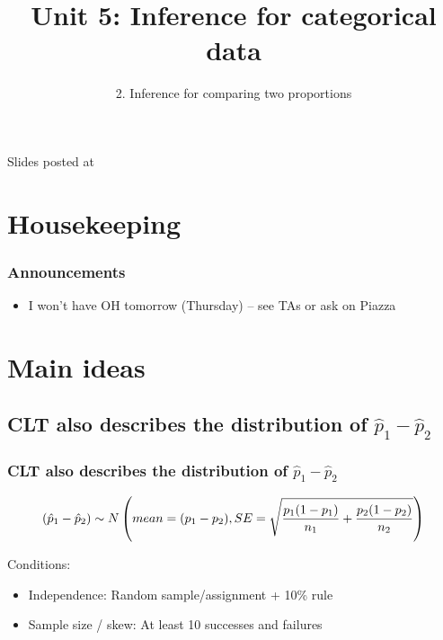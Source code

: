 \documentclass[slidestop,compress,mathserif,12pt,t,professionalfonts,xcolor=table]{beamer}
\title{Unit 5: Inference for categorical data}
\subtitle{2. Inference for comparing two proportions}
\author{\CourseName}
\date{}
\institute{\InstituteName}
\begin{document}



\begin{frame}[plain]

\titlepage

\vfill

{\scriptsize {} \hfill Slides posted at  \webURL{\CourseSite}}

\addtocounter{framenumber}{-1} 

\end{frame}


\section{Housekeeping}


\begin{frame}
\frametitle{Announcements}

\begin{itemize}

\item I won't have OH tomorrow (Thursday) -- see TAs or ask on Piazza

\end{itemize}

\end{frame}


\section{Main ideas}


\subsection{CLT also describes the distribution of $\hat{p}_1 - \hat{p}_2$}
\label{mi1}


\begin{frame}
\frametitle{CLT also describes the distribution of $\hat{p}_1 - \hat{p}_2$}

\[ (\hat{p}_1 - \hat{p}_2) \sim N \left(  mean = (p_1 - p_2), SE = \sqrt{ \frac{p_1(1-p_1)}{n_1} + \frac{p_2(1-p_2)}{n_2} }  \right) \]

Conditions:
\begin{itemize}
\item Independence: Random sample/assignment + 10\% rule
\item Sample size / skew: At least 10 successes and failures
\end{itemize}

\end{frame}
\end{document}
